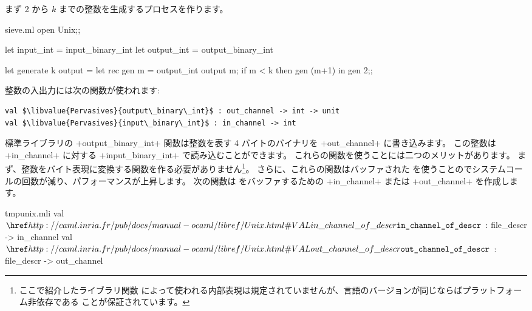 まず 2 から $k$ までの整数を生成するプロセスを作ります。
%
\begin{listingcodefile}{sieve.ml}
open Unix;;

let input_int = input_binary_int
let output_int = output_binary_int

let generate k output =
  let rec gen m =
    output_int output m;
    if m < k then gen (m+1)
  in
  gen 2;;
\end{listingcodefile}
整数の入出力には次の関数が使われます:
%
\begin{lstlisting}
val $\libvalue{Pervasives}{output\_binary\_int}$ : out_channel -> int -> unit
val $\libvalue{Pervasives}{input\_binary\_int}$ : in_channel -> int
\end{lstlisting}
%
標準ライブラリの \ml+output_binary_int+ 関数は整数を表す 4 バイトのバイナリを
\ml+out_channel+ に書き込みます。
この整数は \ml+in_channel+ に対する \ml+input_binary_int+ で読み込むことができます。
これらの関数を使うことには二つのメリットがあります。
まず、整数をバイト表現に変換する関数を作る必要がありません\footnote{ここで紹介したライブラリ関数
  によって使われる内部表現は規定されていませんが、言語のバージョンが同じならばプラットフォーム非依存である
  ことが保証されています。}。
さらに、これらの関数はバッファされた \io を使うことのでシステムコールの回数が減り、パフォーマンスが上昇します。
次の関数は \io をバッファするための \ml+in_channel+ または \ml+out_channel+ を作成します。
%
\begin{listingcodefile}{tmpunix.mli}
val $\indexlibvalue{Unix}{in\_channel\_of\_descr}$ : file_descr -> in_channel
val $\indexlibvalue{Unix}{out\_channel\_of\_descr}$ : file_descr -> out_channel
\end{listingcodefile}
